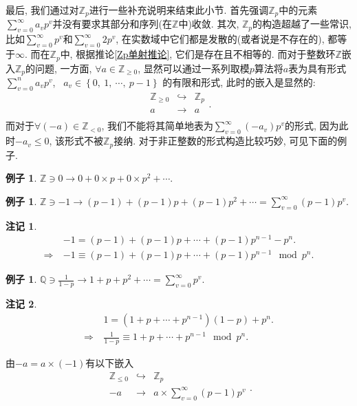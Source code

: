 \documentclass[UTF8, twoside]{ctexart}
\theoremstyle{nonumberplain}
\theoremstyle{nonumberplain}
\newtheorem{zhuji}{\heiti 注记}  %
\theoremstyle{plain}
\newtheorem{lizi}[dingyi]{例子}
\begin{document}
	最后, 我们通过对${{\mathbb{Z}}_{p}}$进行一些补充说明来结束此小节. 首先强调${{\mathbb{Z}}_{p}}$中的元素$\sum_{v=0}^{\infty }{{{a}_{v}}{{p}^{v}}}$并没有要求其部分和序列(在$\mathbb{Z}$中)收敛. 其次, ${{\mathbb{Z}}_{p}}$的构造超越了一些常识, 比如$\sum_{v=0}^{\infty }{{{p}^{v}}}$和$\sum_{v=0}^{\infty }{2{{p}^{v}}}$, 在实数域中它们都是发散的(或者说是不存在的), 都等于$\infty $. 而在${{\mathbb{Z}}_{p}}$中, 根据推论\ref{Zp单射推论}, 它们是存在且不相等的. 而对于整数环$\mathbb{Z}$嵌入${{\mathbb{Z}}_{p}}$的问题, 一方面, $\forall a\in {{\mathbb{Z}}_{\ge 0}}$, 显然可以通过一系列取模$p$算法将$a$表为具有形式
	$
		\sum\limits_{v=0}^{n}{{{a}_{v}}{{p}^{v}}}$,
		\ 
		${{a}_{v}}\in \left\{ 0,\ 1,\ \cdots ,\ p-1 \right\}
	$
	的有限和形式, 此时的嵌入是显然的:
	\[
		\begin{matrix}
			{{\mathbb{Z}}_{\ge 0}} & \hookrightarrow  & {{\mathbb{Z}}_{p}}  \\
			a & \to  & a  \\
		\end{matrix}.
	\]
	而对于$\forall \left( -a \right)\in {{\mathbb{Z}}_{<0}}$, 我们不能将其简单地表为$\sum_{v=0}^{\infty }{\left( -{{a}_{v}} \right){{p}^{v}}}$的形式, 因为此时$-{{a}_{v}}\le 0$, 该形式不被${{\mathbb{Z}}_{p}}$接纳. 对于非正整数的形式构造比较巧妙, 可见下面的例子. 
	\begin{lizi}
		$\mathbb{Z} \ni 0 \to 0+0\times p+0\times {{p}^{2}}+\cdots .$
	\end{lizi}
	\begin{lizi}
		$\mathbb{Z} \ni -1 \to \left( p-1 \right)+\left( p-1 \right)p+\left( p-1 \right){{p}^{2}}+\cdots =\sum_{v=0}^{\infty }{\left( p-1 \right){{p}^{v}}}.$
	\end{lizi}
	\begin{zhuji}
		\begin{align*}
			& -1=\left( p-1 \right)+\left( p-1 \right)p+\cdots +\left( p-1 \right){{p}^{n-1}}-{{p}^{n}}. \\ 
			\Longrightarrow\ & -1\equiv \left( p-1 \right)+\left( p-1 \right)p+\cdots +\left( p-1 \right){{p}^{n-1}}\ \bmod {{p}^{n}}. 
		\end{align*}
	\end{zhuji}
	\begin{lizi}
		$\mathbb{Q} \ni \frac{1}{1-p}\to 1+p+{{p}^{2}}+\cdots=\sum_{v=0}^{\infty }{{{p}^{v}}} .$
	\end{lizi}
	\begin{zhuji}
		\begin{align*}
			& 1=\left( 1+p+\cdots +{{p}^{n-1}} \right)\left( 1-p \right)+{{p}^{n}}. \\ 
			\Longrightarrow\ & \frac{1}{1-p}\equiv 1+p+\cdots +{{p}^{n-1}}\ \bmod {{p}^{n}}. 
		\end{align*}
	\end{zhuji}
	由$-a=a\times \left( -1 \right)$有以下嵌入
	\[\begin{matrix}
		{{\mathbb{Z}}_{\le 0}} & \hookrightarrow  & {{\mathbb{Z}}_{p}}  \\
		-a & \to  & a\times \sum\limits_{v=0}^{\infty }{\left( p-1 \right){{p}^{v}}}  \\
	\end{matrix}.\]
	
\end{document}
